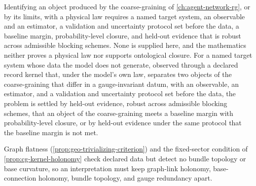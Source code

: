 Identifying an object produced by the coarse-graining of
\cref{ch:agent-network-rg}, or by its limits, with a physical law requires a
named target system, an observable and an estimator, a validation and
uncertainty protocol set before the data, a baseline margin, probability-level
closure, and held-out evidence that is robust across admissible blocking
schemes. None is supplied here, and the mathematics neither proves a physical
law nor supports ontological closure. For a named target system whose data the
model does not generate, observed through a declared record kernel that, under
the model's own law, separates two objects of the coarse-graining that differ
in a gauge-invariant datum, with an observable, an estimator, and a validation
and uncertainty protocol set before the data, the problem is settled by
held-out evidence, robust across admissible blocking schemes, that an object of
the coarse-graining meets a baseline margin with probability-level closure, or
by held-out evidence under the same protocol that the baseline margin is not
met.

Graph flatness (\cref{prop:geo-trivializing-criterion}) and the fixed-sector
condition of \cref{prop:cg-kernel-holonomy} check declared data but detect no
bundle topology or base curvature, so an interpretation must keep graph-link
holonomy, base-connection holonomy, bundle topology, and gauge redundancy apart.

